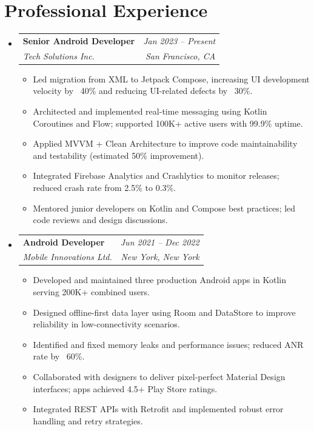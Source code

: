 \documentclass[a4paper,11pt]{article}
\makeatletter
\newcommand{\resumeSubheading}[4]{
    \vspace{2pt}\item
    \begin{tabular*}{\textwidth}[t]{@{\extracolsep{\fill}} l r}
        \textbf{#1} & \textit{#2} \\
        \textit{#3} & \textit{#4} \\
    \end{tabular*}\vspace{2pt}
}
\newcommand{\resumeItem}[1]{
    \item\small{#1}
}
\makeatother
\begin{document}
\section{Professional Experience}
\begin{itemize}[leftmargin=0.12in]
 \resumeSubheading
    {Senior Android Developer}{Jan 2023 -- Present}
    {Tech Solutions Inc.} {San Francisco, CA}
    \begin{itemize}[leftmargin=0.18in]
        \resumeItem{Led migration from XML to Jetpack Compose, increasing UI development velocity by ~40\% and reducing UI-related defects by ~30\%.}
        \resumeItem{Architected and implemented real-time messaging using Kotlin Coroutines and Flow; supported 100K+ active users with 99.9\% uptime.}
        \resumeItem{Applied MVVM + Clean Architecture to improve code maintainability and testability (estimated 50\% improvement).}
        \resumeItem{Integrated Firebase Analytics and Crashlytics to monitor releases; reduced crash rate from 2.5\% to 0.3\%.}
        \resumeItem{Mentored junior developers on Kotlin and Compose best practices; led code reviews and design discussions.}
    \end{itemize}

 \resumeSubheading
    {Android Developer}{Jun 2021 -- Dec 2022}
    {Mobile Innovations Ltd.} {New York, New York}
    \begin{itemize}[leftmargin=0.18in]
        \resumeItem{Developed and maintained three production Android apps in Kotlin serving 200K+ combined users.}
        \resumeItem{Designed offline-first data layer using Room and DataStore to improve reliability in low-connectivity scenarios.}
        \resumeItem{Identified and fixed memory leaks and performance issues; reduced ANR rate by ~60\%.}
        \resumeItem{Collaborated with designers to deliver pixel-perfect Material Design interfaces; apps achieved 4.5+ Play Store ratings.}
        \resumeItem{Integrated REST APIs with Retrofit and implemented robust error handling and retry strategies.}
    \end{itemize}
\end{itemize}

\end{document}
